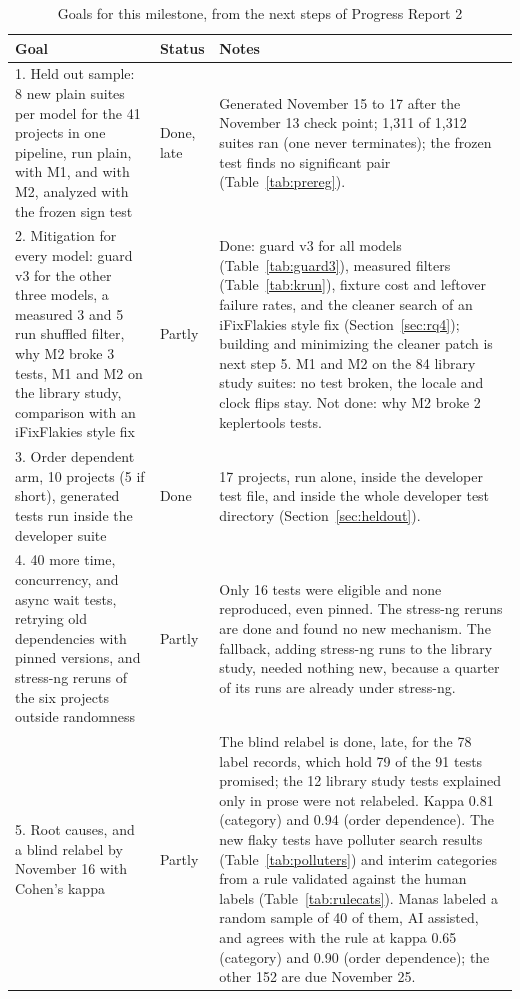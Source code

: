 \documentclass[sigconf,nonacm]{acmart}
\begin{document}
\begin{table}[t]
\caption{Goals for this milestone, from the next steps of Progress Report 2}
\label{tab:goals}
\small
\begin{tabularx}{\textwidth}{p{5.6cm}p{1.6cm}X}
\toprule
Goal & Status & Notes \\
\midrule
1. Held out sample: 8 new plain suites per model for the 41 projects in one pipeline, run plain, with M1, and with M2, analyzed with the frozen sign test & Done, late & Generated November 15 to 17 after the November 13 check point; 1,311 of 1,312 suites ran (one never terminates); the frozen test finds no significant pair (Table~\ref{tab:prereg}). \\
2. Mitigation for every model: guard v3 for the other three models, a measured 3 and 5 run shuffled filter, why M2 broke 3 tests, M1 and M2 on the library study, comparison with an iFixFlakies style fix & Partly & Done: guard v3 for all models (Table~\ref{tab:guard3}), measured filters (Table~\ref{tab:krun}), fixture cost and leftover failure rates, and the cleaner search of an iFixFlakies style fix (Section~\ref{sec:rq4}); building and minimizing the cleaner patch is next step 5. M1 and M2 on the 84 library study suites: no test broken, the locale and clock flips stay. Not done: why M2 broke 2 keplertools tests. \\
3. Order dependent arm, 10 projects (5 if short), generated tests run inside the developer suite & Done & 17 projects, run alone, inside the developer test file, and inside the whole developer test directory (Section~\ref{sec:heldout}). \\
4. 40 more time, concurrency, and async wait tests, retrying old dependencies with pinned versions, and stress-ng reruns of the six projects outside randomness & Partly & Only 16 tests were eligible and none reproduced, even pinned. The stress-ng reruns are done and found no new mechanism. The fallback, adding stress-ng runs to the library study, needed nothing new, because a quarter of its runs are already under stress-ng. \\
5. Root causes, and a blind relabel by November 16 with Cohen's kappa & Partly & The blind relabel is done, late, for the 78 label records, which hold 79 of the 91 tests promised; the 12 library study tests explained only in prose were not relabeled. Kappa 0.81 (category) and 0.94 (order dependence). The new flaky tests have polluter search results (Table~\ref{tab:polluters}) and interim categories from a rule validated against the human labels (Table~\ref{tab:rulecats}). Manas labeled a random sample of 40 of them, AI assisted, and agrees with the rule at kappa 0.65 (category) and 0.90 (order dependence); the other 152 are due November 25. \\

\end{tabularx}
\end{table}
\end{document}
